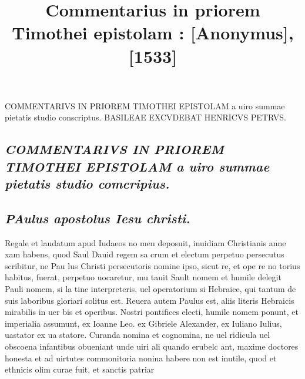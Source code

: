 \documentclass{article}
\begin{document}
\date{}
        \title{Commentarius in priorem Timothei epistolam : [Anonymus], [1533]}
\maketitle
\tableofcontents
\clearpage
\begin{pages} 
\beginnumbering
        COMMENTARIVS IN PRIOREM TIMOTHEI EPISTOLAM a uiro summae pietatis studio conscriptus. BASILEAE EXCVDEBAT HENRICVS PETRVS. 
\marginpar{[ p.3 ]}
{}
\subsection*{\textit{COMMENTARIVS IN PRIOREM TIMOTHEI EPISTOLAM a uiro summae pietatis studio comcripius. }}
{}
\subsection*{\textit{\huge\textbf{P}\normalsize Aulus apostolus Iesu christi. }}\pstart Regale et laudatum apud Iudaeos no men deposuit, inuidiam Christianis anne xam habens, quod Saul Dauid regem sa crum et electum perpetuo persecutus scribitur, ne Pau lus Christi persecutoris nomine ipso, sicut re, et ope re no torius habitus, fuerat, perpetuo uocaretur, mu tauit Sault nomem et humile delegit Pauli nomem, si la tine interpreteris, uel operatorium si Hebraice, qui tantum de suis laboribus gloriari solitus est. Reuera autem Paulus est, aliis literis Hebraicis mirabilis in uer bis et operibus. Nostri pontifices electi, humile nomem ponunt, et imperialia assumunt, ex Ioanne Leo. ex Gibriele Alexander, ex Iuliano Iulius, uastator ex ua statore. Curanda nomina et cognomina, ne uel ridicula uel obscoena infantibus obueniant unde uiri ali quando erubelc ant, maxime doctores honesta et ad uirtutes commonitoria nonina habere non est inutile, quod et ethnicis olim curae fuit, et sanctis patriar\pend

\end{pages}
\end{document}
